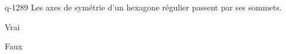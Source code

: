 \begin{truefalse}{q-1289}
Les axes de symétrie d'un hexagone régulier passent par ses sommets.
\item Vrai
\item* Faux
\end{truefalse}

